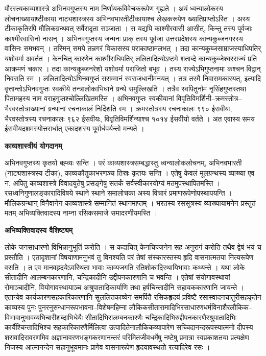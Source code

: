 \documentclass[10pt, a5paper, twoside]{article}
\newcommand{\customparagraph}[1]{
    \noindent \textbf{#1} \par
    \penalty 10000 %
    \vspace{0.1cm plus 0.05cm minus 0.02cm}
    \penalty 10000 %
}
\begin{document}
पौरस्त्यकाव्यशास्त्रे अभिनवगुप्तस्य नाम निर्णायकविवेचकरूपेण गृह्यते । अयं ध्वन्यालोकस्य लोचनाख्यायाष्टीकाया नाट्यशास्त्रस्य अभिनवभारतीटीकायाश्च लेखकरूपेण ख्यातिप्राप्तोऽस्ति । अस्य टीकाकृतिरपि मौलिकग्रन्थवत् सर्वैरादृता सञ्जाता । स यद्यपि काश्मीरवासी  आसीत्, किन्तु तस्य पूर्वजाः काश्मीरवासिनो नासन् । अभिनवगुप्तस्य जन्मनः प्राक् तस्य पूर्वजा उत्तरप्रदेशस्य कान्यकुब्जनगरस्य वासिनः समभवन् । तस्मिन् समये तन्नगरं विकासस्य पराकाष्ठामलभत् । तदा कान्यकुब्जसाम्राजस्याधिपतिर् यशोवर्मा अवर्तत । केनचित् कारणेन काश्मीराधिपतिर् ललितादित्योऽष्टमे शताब्दे कान्यकुब्जेश्वरराज्यं प्रति आक्रमणं चकार । तदा कान्यकुब्जनरेशो यशोवर्मा पराजितो बभूव । तस्य राज्येऽभिगुप्तनामा कश्चन विद्वान् निवसति स्म । ललितादित्योऽभिनवगुप्तं ससम्मानं स्वराजधानीमनयत् । तत्र तस्मै निवासमकारयत्, इत्यादि वृत्तान्तोऽभिनवगुप्तः स्वकीये तन्त्रालोकाभिधाने ग्रन्थे समुल्लिखति । तत्रैव स्वपितुर्नाम नृसिंहगुप्तस्तथा पितामहस्य  नाम  वराहगुप्तश्चोल्लिखितमस्ति । अभिनवगुप्तः स्वकीयानां विवृतिविमर्शिनी–क्रमस्तोत्र–भैरवस्तोत्राख्यानां ग्रन्थानां रचनाकालं निर्दिशति स्म । क्रमस्तोत्रस्य रचनाकालः ९९० ईसवीयः, भैरवस्तोत्रस्य रचनाकालः ९६२ ईसवीयः, विवृतिविमर्शिन्याश्च १०१४ ईसवीयो वर्तते । अत एवास्य समय ईसवीयदशमस्योत्तरार्धात् एकादशस्य पूर्वार्धपर्यन्तो मन्यते ।

\customparagraph{\textbf{काव्यशास्त्रीयं योगदानम्}}

अभिनवगुप्तस्य  कृतयो बह्व्यः सन्ति । परं काव्यशास्त्रसम्बद्धास्तु ध्वन्यालोकलोचनम्, अभिनवभारती (नाट्यशास्त्रस्य टीका), काव्यकौतुकाभरणञ्च तिस्रः कृतयः सन्ति । एतेषु केवलं मूलग्रन्थस्य व्याख्या एव न, अपितु काव्यशास्त्रे विवादयुतेषु प्रसङ्गेषु सतर्कं सर्वस्वीकारयोग्यं मतमुपस्थापितमस्ति । रसध्वनिगुणालङ्कारादिविषये स्थाने स्थाने समालोचका अस्य विचारं  प्रमाणरूपेणोपस्थापयन्ति । मौलिकग्रन्थान् विनैवानेन काव्यशास्त्रे सम्मानितं स्थानमाप्तम् । भरतस्य रससूत्रस्य व्याख्यायामनेन प्रस्तुतं मतम् अभिव्यक्तिवादस्य नाम्ना रसिकसमाजे समादरणीयमस्ति ।

\customparagraph{\textbf{अभिव्यक्तिवादस्य वैशिष्ट्यम्}}

लोके जनसाधारणो विभिन्नानुभूतिं करोति । स कदाचित् केनचिज्जनेन सह अनुरागं करोति तथैव द्वेषं भयं च प्रस्तौति । एतादृशानां विषयाणामनुभवं तु विनश्यति परं तेषां संस्कारस्तस्य हृदि वासनात्मतया नित्यरूपेण वसति । त एव मानवहृदयेऽवस्थिता भावाः काव्यजगति रतिशोकादिस्थायिभावाः कथ्यन्ते । यथा लोके सीतादीनि आलम्बनकारणानि, चन्द्रिकादीनि उद्दीपनकारणानि च भवन्ति । एतेषां संयोगावस्थायां रोमाञ्चादीनि, वियोगावस्थायाञ्च अश्रुपातादिकार्याणि तथा हर्षचिन्तादीनि सहायककारणानि जायन्ते । एतान्येव कार्यकारणसहकारिकारणानि सुललितकाव्येन समर्पितै रसिकहृदयं प्रविष्टै रसास्वादनचातुरीसहकृतेन काव्यस्य पुनः पुनरनुसन्धानरूपभावना–विशेषमहिम्ना    लौकिकसीतारामादिभिरसाधारणधर्मविनाशैरलौकिक–विभावानुभावव्यभिचारीशब्दाभिधेयैः सीतादिभिरालम्बनकारणैः चन्द्रिकादिभिरुद्दीपनकारणैरश्रुपातादिभिः कार्यैश्चिन्तादिभिश्च सहकारिकारणैर्मिलित्वा उत्पादितेनालौकिकव्यापारेण सच्चिदानन्दरूपस्यात्मनो दीपस्य शरावादिरावरणमिव अज्ञानावरणभङ्गकरणानन्तरं परिमितजीवधर्मेषु नष्टेषु प्रमात्रा स्वप्रकाशतया प्रत्यक्षेण निजस्य आत्मानन्देन सहानुभूयमानः प्रागेव वासनारूपेण हृदयावस्थतो रत्यादिरेव रसः ।
\end{document}
